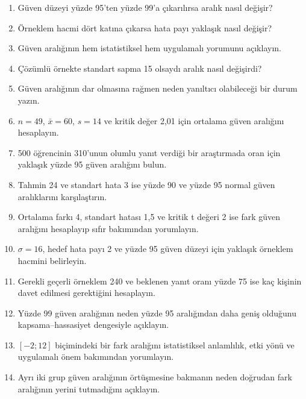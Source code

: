 \begin{enumerate}
  \item Güven düzeyi yüzde 95'ten yüzde 99'a çıkarılırsa aralık nasıl değişir?
  \item Örneklem hacmi dört katına çıkarsa hata payı yaklaşık nasıl değişir?
  \item Güven aralığının hem istatistiksel hem uygulamalı yorumunu açıklayın.
  \item Çözümlü örnekte standart sapma 15 olsaydı aralık nasıl değişirdi?
  \item Güven aralığının dar olmasına rağmen neden yanıltıcı olabileceği bir durum yazın.
  \item $n=49$, $\bar x=60$, $s=14$ ve kritik değer 2,01 için ortalama güven
  aralığını hesaplayın.
  \item 500 öğrencinin 310'unun olumlu yanıt verdiği bir araştırmada oran için
  yaklaşık yüzde 95 güven aralığını bulun.
  \item Tahmin 24 ve standart hata 3 ise yüzde 90 ve yüzde 95 normal güven
  aralıklarını karşılaştırın.
  \item Ortalama farkı 4, standart hatası 1,5 ve kritik t değeri 2 ise fark
  güven aralığını hesaplayıp sıfır bakımından yorumlayın.
  \item $\sigma=16$, hedef hata payı 2 ve yüzde 95 güven düzeyi için yaklaşık
  örneklem hacmini belirleyin.
  \item Gerekli geçerli örneklem 240 ve beklenen yanıt oranı yüzde 75 ise kaç
  kişinin davet edilmesi gerektiğini hesaplayın.
  \item Yüzde 99 güven aralığının neden yüzde 95 aralığından daha geniş
  olduğunu kapsama--hassasiyet dengesiyle açıklayın.
  \item $[-2;12]$ biçimindeki bir fark aralığını istatistiksel anlamlılık,
  etki yönü ve uygulamalı önem bakımından yorumlayın.
  \item Ayrı iki grup güven aralığının örtüşmesine bakmanın neden doğrudan fark
  aralığının yerini tutmadığını açıklayın.
\end{enumerate}